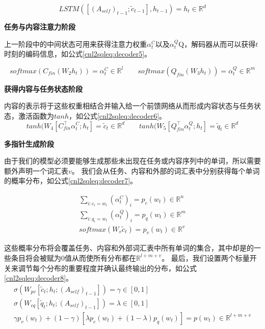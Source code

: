 \begin{equation}
  \label{cnl2sqleq:decoder4}
  LSTM([(A_{self})_{t-1};\widetilde{c}_{t-1}],h_{t-1})= h_t \in \mathbb{R}^{d} 
\end{equation}

\textbf{任务与内容注意力阶段}

上一阶段中的中间状态可用来获得注意力权重$\alpha^C_t$以及$\alpha^Q_t$Q，解码器从而可以获得$t$时刻的编码信息，如公式\ref{cnl2sqleq:decoder5}。

\begin{equation}
  \label{cnl2sqleq:decoder5}
  softmax(C_{fin}(W_2 h_t)) = \alpha^C_t \in \mathbb{R}^{l} \qquad softmax(Q_{fin}(W_3 h_t)) = \alpha^Q_t \in \mathbb{R}^{m}
\end{equation}

\textbf{获得内容与任务状态阶段}

内容的表示将于这些权重相结合并输入给一个前馈网络从而形成内容状态与任务状态，激活函数为$tanh$，如公式\ref{cnl2sqleq:decoder6}。
\begin{equation}
  \label{cnl2sqleq:decoder6}
  tanh(W_4[C^{\top}_{fin}\alpha^C_t;h_t] = \widetilde{c}_{t} \in \mathbb{R}^{d} \qquad tanh(W_5[Q^{\top}_{fin}\alpha^Q_t;h_t] = \widetilde{q}_{t} \in \mathbb{R}^{d}
\end{equation}

\textbf{多指针生成阶段}

由于我们的模型必须要能够生成那些未出现在任务或内容序列中的单词，所以需要额外声明一个词汇表$v$。
我们会从任务、内容和外部的词汇表中分别获得每个单词的概率分布，如公式\ref{cnl2sqleq:decoder7}。

\begin{gather}
  \label{cnl2sqleq:decoder7}
  \sum_{i:c_i=w_t} (\alpha^C_t)_i = p_c(w_t) \in \mathbb{R}^{n}\\
  \sum_{i:q_i=w_t} (\alpha^Q_t)_i = p_q(w_t) \in \mathbb{R}^{m}\\
  softmax(W_v\widetilde{c}_t) = p_v(w_t) \in \mathbb{R}^{v}
\end{gather}

这些概率分布将会覆盖任务、内容和外部词汇表中所有单词的集合，其中却是的一些条目将会被赋为0值从而使所有分布都在$\mathbb{R}^{l+m+v}$。
最后，我们设置两个标量开关来调节每个分布的重要程度并确认最终输出的分布，如公式\ref{cnl2sqleq:decoder8}。
\begin{gather}
  \label{cnl2sqleq:decoder8}
  \sigma (W_{pv}[\widetilde{c}_t;h_t;(A_{self})_{t-1}]) = \gamma \in [0,1]\\
  \sigma (W_{cq}[\widetilde{q}_t;h_t;(A_{self})_{t-1}]) = \lambda \in [0,1]\\
  \gamma p_v(w_t) + (1 - \gamma)[\lambda p_c(w_t) + (1 - \lambda)p_q(w_t)] = p(w_t) \in \mathbb{R}^{l+m+v}
\end{gather}

